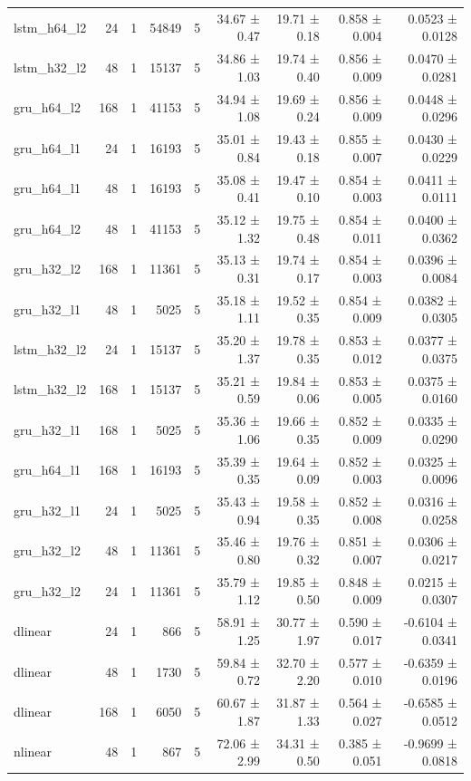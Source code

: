 \begin{table}[htbp]
\begin{tabular}{lrrrrrrrr}
lstm\_h64\_l2 & 24 & 1 & 54849 & 5 & 34.67 ± 0.47 & 19.71 ± 0.18 & 0.858 ± 0.004 & 0.0523 ± 0.0128 \\
lstm\_h32\_l2 & 48 & 1 & 15137 & 5 & 34.86 ± 1.03 & 19.74 ± 0.40 & 0.856 ± 0.009 & 0.0470 ± 0.0281 \\
gru\_h64\_l2 & 168 & 1 & 41153 & 5 & 34.94 ± 1.08 & 19.69 ± 0.24 & 0.856 ± 0.009 & 0.0448 ± 0.0296 \\
gru\_h64\_l1 & 24 & 1 & 16193 & 5 & 35.01 ± 0.84 & 19.43 ± 0.18 & 0.855 ± 0.007 & 0.0430 ± 0.0229 \\
gru\_h64\_l1 & 48 & 1 & 16193 & 5 & 35.08 ± 0.41 & 19.47 ± 0.10 & 0.854 ± 0.003 & 0.0411 ± 0.0111 \\
gru\_h64\_l2 & 48 & 1 & 41153 & 5 & 35.12 ± 1.32 & 19.75 ± 0.48 & 0.854 ± 0.011 & 0.0400 ± 0.0362 \\
gru\_h32\_l2 & 168 & 1 & 11361 & 5 & 35.13 ± 0.31 & 19.74 ± 0.17 & 0.854 ± 0.003 & 0.0396 ± 0.0084 \\
gru\_h32\_l1 & 48 & 1 & 5025 & 5 & 35.18 ± 1.11 & 19.52 ± 0.35 & 0.854 ± 0.009 & 0.0382 ± 0.0305 \\
lstm\_h32\_l2 & 24 & 1 & 15137 & 5 & 35.20 ± 1.37 & 19.78 ± 0.35 & 0.853 ± 0.012 & 0.0377 ± 0.0375 \\
lstm\_h32\_l2 & 168 & 1 & 15137 & 5 & 35.21 ± 0.59 & 19.84 ± 0.06 & 0.853 ± 0.005 & 0.0375 ± 0.0160 \\
gru\_h32\_l1 & 168 & 1 & 5025 & 5 & 35.36 ± 1.06 & 19.66 ± 0.35 & 0.852 ± 0.009 & 0.0335 ± 0.0290 \\
gru\_h64\_l1 & 168 & 1 & 16193 & 5 & 35.39 ± 0.35 & 19.64 ± 0.09 & 0.852 ± 0.003 & 0.0325 ± 0.0096 \\
gru\_h32\_l1 & 24 & 1 & 5025 & 5 & 35.43 ± 0.94 & 19.58 ± 0.35 & 0.852 ± 0.008 & 0.0316 ± 0.0258 \\
gru\_h32\_l2 & 48 & 1 & 11361 & 5 & 35.46 ± 0.80 & 19.76 ± 0.32 & 0.851 ± 0.007 & 0.0306 ± 0.0217 \\
gru\_h32\_l2 & 24 & 1 & 11361 & 5 & 35.79 ± 1.12 & 19.85 ± 0.50 & 0.848 ± 0.009 & 0.0215 ± 0.0307 \\
dlinear & 24 & 1 & 866 & 5 & 58.91 ± 1.25 & 30.77 ± 1.97 & 0.590 ± 0.017 & -0.6104 ± 0.0341 \\
dlinear & 48 & 1 & 1730 & 5 & 59.84 ± 0.72 & 32.70 ± 2.20 & 0.577 ± 0.010 & -0.6359 ± 0.0196 \\
dlinear & 168 & 1 & 6050 & 5 & 60.67 ± 1.87 & 31.87 ± 1.33 & 0.564 ± 0.027 & -0.6585 ± 0.0512 \\
nlinear & 48 & 1 & 867 & 5 & 72.06 ± 2.99 & 34.31 ± 0.50 & 0.385 ± 0.051 & -0.9699 ± 0.0818 \\

\end{tabular}
\end{table}

